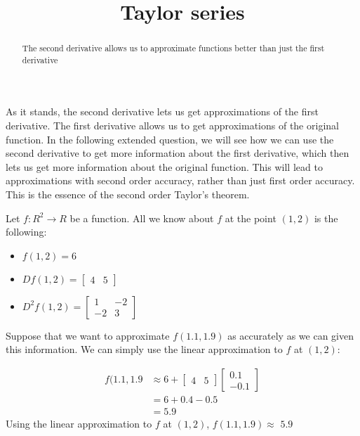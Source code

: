\documentclass{article}
\title{Taylor series}
\newcommand{\R}{R}
\newcommand{\verticalvector}[1]{\begin{bmatrix}#1\end{bmatrix}}
\newcommand{\answer}[1]{#1}
\newenvironment{question}{}{}
\newenvironment{hint}{}{}
\newenvironment{solution}{}{}
\begin{document}
\begin{abstract}
  The second derivative allows us to approximate functions better than just the first derivative
\end{abstract}

As it stands, the second derivative lets us get approximations of the first derivative.  The first derivative allows us to get approximations of the original function.
In the following extended question, we will see how we can use the second derivative to get more information about the first derivative, which then lets us get more
information about the original function.  This will lead to approximations with second order accuracy, rather than just first order accuracy.  This is the essence of 
the second order Taylor's theorem.

\begin{question}
  Let $f:\R^2 \to \R$ be a function.  All we know about $f$ at the point $(1,2)$ is the following:
  \begin{itemize}
  \item $f(1,2) = 6$
  \item \(Df(1,2) = \begin{bmatrix} 4 & 5 \end{bmatrix}\)
  \item \( D^2f(1,2)  = \begin{bmatrix} 1 & -2 \\ -2 & 3\end{bmatrix}\)
  \end{itemize} 
  
  Suppose that we want to approximate $f(1.1,1.9)$ as accurately as we can given this information.
  We can simply use the linear approximation to $f$ at $(1,2)$:
  
  \begin{solution}
    \begin{hint}
      \begin{align*}
        f(1.1,1.9 &\approx 6+\begin{bmatrix} 4 & 5 \end{bmatrix} \verticalvector{0.1\\-0.1}\\
        &=6+0.4-0.5\\
        &=5.9
      \end{align*}
    \end{hint}
    Using the linear approximation to $f$ at $(1,2)$, $f(1.1,1.9) \approx$ \answer{$5.9$}
  \end{solution}
  

\end{question}
\end{document}

